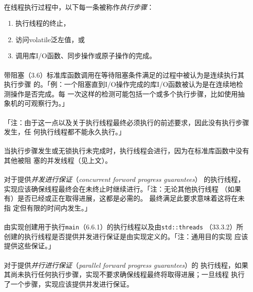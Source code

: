 \paragraph{}
在线程执行过程中，以下每一条被称作\textit{执行步骤}：
\begin{enumerate}
  \item{执行线程的终止，}
  \item{访问volatile泛左值，或}
  \item{调用库I/O函数、同步操作或原子操作的完成。}
\end{enumerate}

\paragraph{}
带阻塞（3.6）标准库函数调用在等待阻塞条件满足的过程中被认为是连续执行其执行步骤
的。「例：一个阻塞直到I/O操作完成的库I/O函数被认为是在连续地检测操作是否完成。每
一次这样的检测可能包括一个或多个执行步骤，比如使用抽象机的可观察行为。」

\paragraph{}
「注：由于这一点以及关于执行线程最终必须执行的前述要求，因此没有执行步骤发生，任
何执行线程都不能永久执行。」

\paragraph{}
当执行步骤发生或无锁执行未完成时，执行线程会进行，因为在标准库函数中没有其他被阻
塞的并发线程（见上文）。

\paragraph{}
对于提供\textit{并发进行保证}（\textit{concurrent forword progress guarantees}）
的执行线程，实现应该确保线程最终会在未终止时继续进行。「注：无论其他执行线程
（如果有）是否已经或正在取得进展，这都是必需的。 最终满足此要求意味着这将在未指
定但有限的时间内发生。」

\paragraph{}
由实现创建用于执行\texttt{main}（6.6.1）的执行线程以及由\texttt{std::threads}
（33.3.2）所创建的执行线程是否提供并发进行保证是由实现定义的。「注：通用目的实现
应该提供这些保证。」

\paragraph{}
对于提供\textit{并行进行保证}（\textit{parallel forward progress guarantees}）的
执行线程，如果其尚未执行任何执行步骤，实现不要求确保线程最终将取得进展；一旦线程
执行了一个步骤，实现应该提供并发进行保证。

